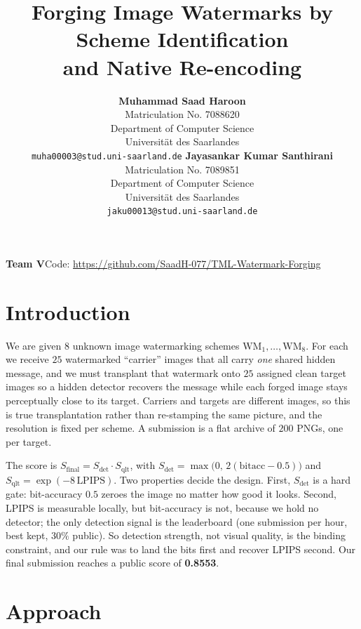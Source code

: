 \documentclass{article} %
\title{Forging Image Watermarks by Scheme Identification\\ and Native Re-encoding}
\author{%
\textbf{Muhammad Saad Haroon} \\
Matriculation No. 7088620 \\
Department of Computer Science \\
Universit\"at des Saarlandes \\
\texttt{muha00003@stud.uni-saarland.de}
\And
\textbf{Jayasankar Kumar Santhirani} \\
Matriculation No. 7089851 \\
Department of Computer Science \\
Universit\"at des Saarlandes \\
\texttt{jaku00013@stud.uni-saarland.de}
}
\newcommand{\bestscore}{0.8553}
\begin{document}
\maketitle
\vspace{-2.2em}
\begin{center}
\small\textbf{Team V}\quad\textbullet\quad Code: \url{https://github.com/SaadH-077/TML-Watermark-Forging}
\end{center}
\vspace{-1.4em}

\section{Introduction}
We are given $8$ unknown image watermarking schemes $\mathrm{WM}_1,\dots,\mathrm{WM}_8$. For each we receive
$25$ watermarked ``carrier'' images that all carry \emph{one} shared hidden message, and we must transplant
that watermark onto $25$ assigned clean target images so a hidden detector recovers the message while each
forged image stays perceptually close to its target. Carriers and targets are different images, so this is
true transplantation rather than re-stamping the same picture, and the resolution is fixed per scheme. A
submission is a flat archive of $200$ PNGs, one per target.

The score is $S_\text{final}=S_\text{det}\cdot S_\text{qlt}$, with
$S_\text{det}=\max\!\big(0,\,2(\text{bitacc}-0.5)\big)$ and $S_\text{qlt}=\exp(-8\,\text{LPIPS})$. Two
properties decide the design. First, $S_\text{det}$ is a hard gate: bit-accuracy $0.5$ zeroes the image no
matter how good it looks. Second, LPIPS is measurable locally, but bit-accuracy is not, because we hold no
detector; the only detection signal is the leaderboard (one submission per hour, best kept, $30\%$ public). So
detection strength, not visual quality, is the binding constraint, and our rule was to land the bits first and
recover LPIPS second. Our final submission reaches a public score of \textbf{\bestscore}.

\section{Approach}
\end{document}
